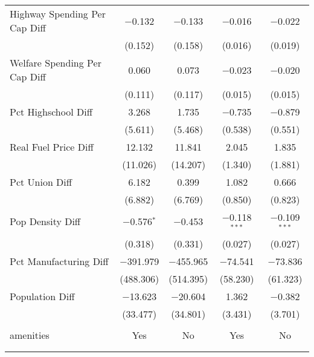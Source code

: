 \begin{table}[!htbp]
\begin{tabular}{@{\extracolsep{5pt}}lcccc}
  Highway Spending Per Cap Diff & $-$0.132 & $-$0.133 & $-$0.016 & $-$0.022 \\ 
  & (0.152) & (0.158) & (0.016) & (0.019) \\ 
  Welfare Spending Per Cap Diff & 0.060 & 0.073 & $-$0.023 & $-$0.020 \\ 
  & (0.111) & (0.117) & (0.015) & (0.015) \\ 
  Pct Highschool Diff & 3.268 & 1.735 & $-$0.735 & $-$0.879 \\ 
  & (5.611) & (5.468) & (0.538) & (0.551) \\ 
  Real Fuel Price Diff & 12.132 & 11.841 & 2.045 & 1.835 \\ 
  & (11.026) & (14.207) & (1.340) & (1.881) \\ 
  Pct Union Diff & 6.182 & 0.399 & 1.082 & 0.666 \\ 
  & (6.882) & (6.769) & (0.850) & (0.823) \\ 
  Pop Density Diff & $-$0.576$^{*}$ & $-$0.453 & $-$0.118$^{***}$ & $-$0.109$^{***}$ \\ 
  & (0.318) & (0.331) & (0.027) & (0.027) \\ 
  Pct Manufacturing Diff & $-$391.979 & $-$455.965 & $-$74.541 & $-$73.836 \\ 
  & (488.306) & (514.395) & (58.230) & (61.323) \\ 
  Population Diff & $-$13.623 & $-$20.604 & 1.362 & $-$0.382 \\ 
  & (33.477) & (34.801) & (3.431) & (3.701) \\ 
 \hline \\[-1.8ex] 
amenities & Yes & No & Yes & No \\ 
\hline \\[-1.8ex] 
\hline 
\hline \\[-1.8ex] 
\end{tabular} 
\end{table} 

